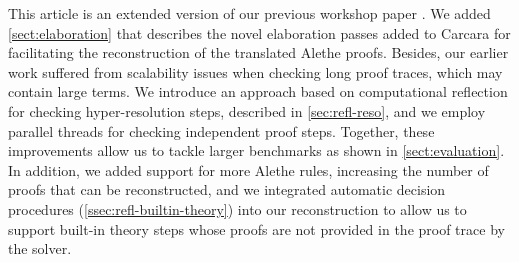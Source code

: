 This article is an extended version of our previous workshop paper \cite{ColtellacciMD24}. We added \cref{sect:elaboration} that describes the novel elaboration passes added to Carcara for facilitating the reconstruction of the translated Alethe proofs. Besides, our earlier work suffered from scalability issues when checking long proof traces, which may contain large terms. We introduce an approach based on computational reflection for checking hyper-resolution steps, described in \cref{sec:refl-reso}, and we employ parallel threads for checking independent proof steps. Together, these improvements allow us to tackle larger benchmarks as shown in \cref{sect:evaluation}.
In addition, we added support for more Alethe rules, increasing the number of proofs that can be reconstructed, and we integrated automatic decision procedures (\cref{ssec:refl-builtin-theory}) into our reconstruction to allow us to support built-in theory steps whose proofs are not provided in the proof trace by the solver.

